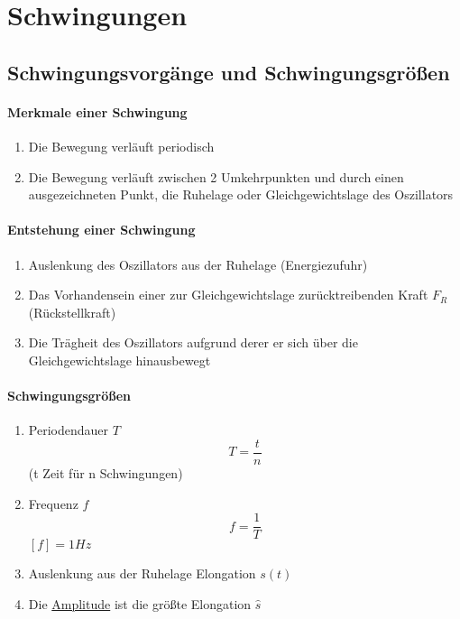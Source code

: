 \section{Schwingungen}
	\subsection{Schwingungsvorgänge und Schwingungsgrößen}
	\paragraph{Merkmale einer Schwingung}
	\begin{enumerate}
		\item Die Bewegung verläuft periodisch
		\item Die Bewegung verläuft zwischen 2 Umkehrpunkten und durch einen ausgezeichneten Punkt, die Ruhelage oder Gleichgewichtslage des Oszillators
	\end{enumerate}
	\paragraph{Entstehung einer Schwingung}
	\begin{enumerate}
		\item Auslenkung des Oszillators aus der Ruhelage (Energiezufuhr)
		\item Das Vorhandensein einer zur Gleichgewichtslage zurücktreibenden Kraft $F_R$ (Rückstellkraft)
		\item Die Trägheit des Oszillators aufgrund derer er sich über die Gleichgewichtslage hinausbewegt
	\end{enumerate}
	\paragraph{Schwingungsgrößen}
	\begin{enumerate}
		\item Periodendauer $T$
		\begin{equation*}
			T=\frac{t}{n}
		\end{equation*}
		(t Zeit für n Schwingungen)
		\item Frequenz $f$
		\begin{equation*}
			f=\frac{1}{T}
		\end{equation*}
		 $[f]=1Hz$
		 \item Auslenkung aus der Ruhelage Elongation $s(t)$
		 \item Die \underline{Amplitude} ist die größte Elongation $\hat{s}$
	\end{enumerate}

